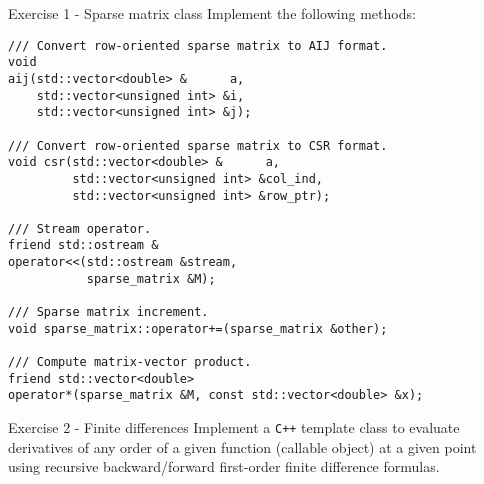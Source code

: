 \documentclass[10pt,aspectratio=169]{beamer}
\begin{document}
\begin{frame}[fragile]{Exercise 1 - Sparse matrix class}
Implement the following methods:
\begin{lstlisting}[basicstyle=\footnotesize]
/// Convert row-oriented sparse matrix to AIJ format.
void
aij(std::vector<double> &      a,
    std::vector<unsigned int> &i,
    std::vector<unsigned int> &j);

/// Convert row-oriented sparse matrix to CSR format.
void csr(std::vector<double> &      a,
         std::vector<unsigned int> &col_ind,
         std::vector<unsigned int> &row_ptr);

/// Stream operator.
friend std::ostream &
operator<<(std::ostream &stream,
           sparse_matrix &M);

/// Sparse matrix increment.
void sparse_matrix::operator+=(sparse_matrix &other);

/// Compute matrix-vector product.
friend std::vector<double>
operator*(sparse_matrix &M, const std::vector<double> &x);
\end{lstlisting}
\end{frame}

\begin{frame}[fragile]{Exercise 2 - Finite differences}
Implement a \texttt{C++} template class to evaluate derivatives of any order of a given function (callable object) at a given point using recursive backward/forward first-order finite difference formulas.
\end{frame}
\end{document}
